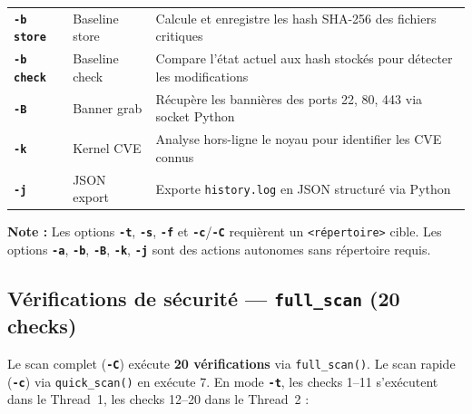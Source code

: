 \documentclass[12pt,a4paper]{article}
\newcommand{\opt}[1]{\texttt{\textcolor{bleuMed}{\textbf{#1}}}}
\newcommand{\cmd}[1]{\texttt{\textcolor{codeText}{#1}}}
\newcommand{\fichier}[1]{\texttt{\textcolor{bleuENSET}{#1}}}
\begin{document}
\begin{longtable}{C{1.6cm} L{2.4cm} L{9.8cm}}
  \opt{-b store} & Baseline store  & Calcule et enregistre les hash SHA-256 des fichiers critiques \\
  \opt{-b check} & Baseline check  & Compare l'état actuel aux hash stockés pour détecter les modifications \\
  \opt{-B}       & Banner grab     & Récupère les bannières des ports 22, 80, 443 via socket Python \\
  \opt{-k}       & Kernel CVE      & Analyse hors-ligne le noyau pour identifier les CVE connus \\
  \opt{-j}       & JSON export     & Exporte \fichier{history.log} en JSON structuré via Python \\
\end{longtable}

\begin{infobox}
\textbf{Note :} Les options \opt{-t}, \opt{-s}, \opt{-f} et \opt{-c}/\opt{-C} requièrent un \texttt{\textless{}répertoire\textgreater{}} cible. Les options \opt{-a}, \opt{-b}, \opt{-B}, \opt{-k}, \opt{-j} sont des actions autonomes sans répertoire requis.
\end{infobox}

\subsection{Vérifications de sécurité --- \cmd{full\_scan} (20 checks)}

Le scan complet (\opt{-C}) exécute \textbf{20 vérifications} via \cmd{full\_scan()}. Le scan rapide (\opt{-c}) via \cmd{quick\_scan()} en exécute 7. En mode \opt{-t}, les checks 1--11 s'exécutent dans le Thread~1, les checks 12--20 dans le Thread~2 :
\end{document}
